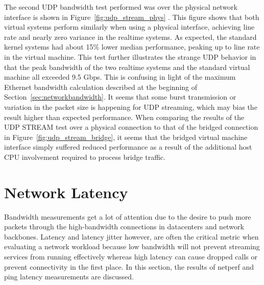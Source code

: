 The second UDP bandwidth test performed was over the physical network interface is shown in Figure~\ref{fig:udp_stream_phys} .  
This figure shows that both virtual systems perform similarly when using a physical interface, achieving line rate and nearly zero variance in the realtime systems.
As expected, the standard kernel systems had about 15\% lower median performance, peaking up to line rate in the virtual machine.
This test further illustrates the strange UDP behavior in that the peak bandwidth of the two realtime systems and the standard virtual machine all exceeded 9.5 Gbps. 
This is confusing in light of the maximum Ethernet bandwidth calculation described at the beginning of Section~\ref{sec:networkbandwidth}.
It seems that some burst transmission or variation in the packet size is happening for UDP streaming, which may bias the result higher than expected performance.
When comparing the results of the UDP STREAM test over a physical connection to that of the bridged connection in Figure~\ref{fig:udp_stream_bridge}, it seems that the bridged virtual machine interface simply suffered reduced performance as a result of the additional host CPU involvement required to process bridge traffic.




\section{Network Latency} %
\label{sec:networklatency}
Bandwidth measurements get a lot of attention due to the desire to push more packets through the high-bandwidth connections in datacenters and network backbones.
Latency and latency jitter however, are often the critical metric when evaluating a network workload because low bandwidth will not prevent streaming services from running effectively whereas high latency can cause dropped calls or prevent connectivity in the first place.
In this section, the results of netperf and ping latency measurements are discussed.  

